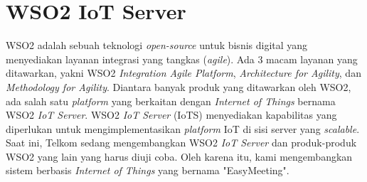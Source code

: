 \section{WSO2 IoT Server}
\tab WSO2 adalah sebuah teknologi \textit{open-source} untuk bisnis digital yang menyediakan layanan integrasi yang tangkas (\textit{agile}). Ada 3 macam layanan yang ditawarkan, yakni WSO2 \textit{Integration Agile Platform}, \textit{Architecture for Agility}, dan \textit{Methodology for Agility}. Diantara banyak produk yang ditawarkan oleh WSO2, ada salah satu \textit{platform} yang berkaitan dengan \textit{Internet of Things} bernama WSO2 \textit{IoT Server}. WSO2 \textit{IoT Server} (IoTS) menyediakan kapabilitas yang diperlukan untuk mengimplementasikan \textit{platform} IoT di sisi server yang \textit{scalable}.\\
\tab Saat ini, Telkom sedang mengembangkan WSO2 \textit{IoT Server} dan produk-produk WSO2 yang lain yang harus diuji coba. Oleh karena itu, kami mengembangkan sistem berbasis \textit{Internet of Things} yang bernama "EasyMeeting".

\cleardoublepage